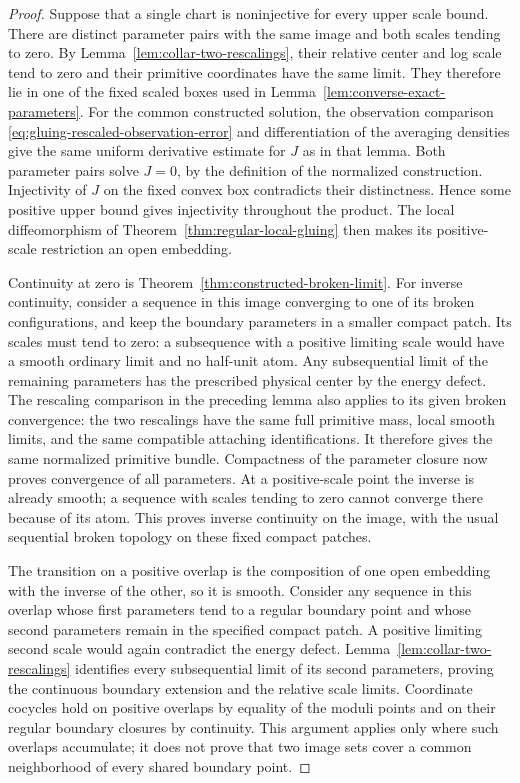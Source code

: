 \documentclass[11pt]{amsart}
\theoremstyle{definition}
\theoremstyle{remark}
\theoremstyle{plain}
\begin{document}
\begin{proof}
Suppose that a single chart is noninjective for every
upper scale bound. There are distinct parameter pairs
with the same image and both scales tending to zero.
By Lemma~\ref{lem:collar-two-rescalings}, their relative
center and log scale tend to zero and their primitive
coordinates have the same limit. They therefore lie
in one of the fixed scaled boxes used in
Lemma~\ref{lem:converse-exact-parameters}.
For the common constructed solution, the observation
comparison \eqref{eq:gluing-rescaled-observation-error}
and differentiation of the averaging densities give
the same uniform derivative estimate for $J$ as in
that lemma. Both parameter pairs solve $J=0$, by the
definition of the normalized construction. Injectivity
of $J$ on the fixed convex box contradicts their
distinctness. Hence some positive upper bound gives
injectivity throughout the product. The local
diffeomorphism of Theorem~\ref{thm:regular-local-gluing}
then makes its positive-scale restriction an open
embedding.

Continuity at zero is
Theorem~\ref{thm:constructed-broken-limit}.
For inverse continuity, consider a sequence in this
image converging to one of its broken configurations,
and keep the boundary parameters in a smaller compact
patch. Its scales must tend to zero: a subsequence
with a positive limiting scale would have a smooth
ordinary limit and no half-unit atom.
Any subsequential limit of the remaining parameters
has the prescribed physical center by the energy defect.
The rescaling comparison in the preceding lemma also
applies to its given broken convergence: the two
rescalings have the same full primitive mass, local
smooth limits, and the same compatible attaching
identifications. It therefore gives the same
normalized primitive bundle. Compactness of the
parameter closure now proves convergence of all
parameters. At a positive-scale point the inverse
is already smooth; a sequence with scales tending
to zero cannot converge there because of its atom.
This proves inverse continuity on the image, with
the usual sequential broken topology on these
fixed compact patches.

The transition on a positive overlap is the composition
of one open embedding with the inverse of the other,
so it is smooth. Consider any sequence in this overlap
whose first parameters tend to a regular boundary
point and whose second parameters remain in the
specified compact patch. A positive limiting second
scale would again contradict the energy defect.
Lemma~\ref{lem:collar-two-rescalings} identifies every
subsequential limit of its second parameters, proving
the continuous boundary extension and the relative
scale limits. Coordinate cocycles hold on positive
overlaps by equality of the moduli points and on their
regular boundary closures by continuity.
This argument applies only where such overlaps
accumulate; it does not prove that two image sets
cover a common neighborhood of every shared boundary
point.
\end{proof}
\end{document}
